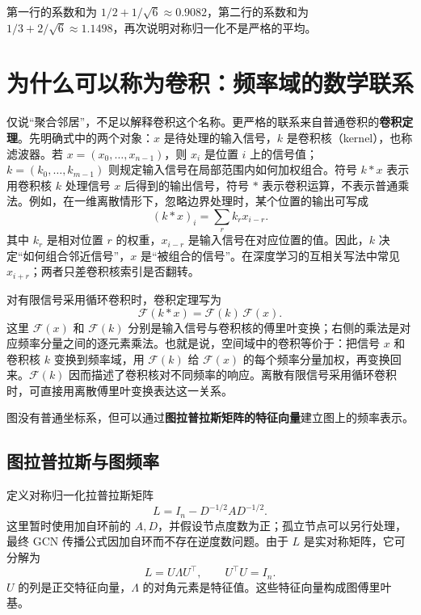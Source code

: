 \documentclass[UTF8,a4paper,11pt,fontset=fandol]{ctexart}
\begin{document}
第一行的系数和为 $1/2+1/\sqrt6\approx0.9082$，第二行的系数和为 $1/3+2/\sqrt6\approx1.1498$，再次说明对称归一化不是严格的平均。

\section{为什么可以称为卷积：频率域的数学联系}
仅说“聚合邻居”，不足以解释卷积这个名称。更严格的联系来自普通卷积的\textbf{卷积定理}。先明确式中的两个对象：$x$ 是待处理的输入信号，$k$ 是卷积核（kernel），也称滤波器。若 $x=(x_0,\ldots,x_{n-1})$，则 $x_i$ 是位置 $i$ 上的信号值；$k=(k_0,\ldots,k_{m-1})$ 则规定输入信号在局部范围内如何加权组合。符号 $k*x$ 表示用卷积核 $k$ 处理信号 $x$ 后得到的输出信号，符号 $*$ 表示卷积运算，不表示普通乘法。例如，在一维离散情形下，忽略边界处理时，某个位置的输出可写成
\begin{equation}
(k*x)_i=\sum_r k_r x_{i-r}.
\end{equation}
其中 $k_r$ 是相对位置 $r$ 的权重，$x_{i-r}$ 是输入信号在对应位置的值。因此，$k$ 决定“如何组合邻近信号”，$x$ 是“被组合的信号”。在深度学习的互相关写法中常见 $x_{i+r}$；两者只差卷积核索引是否翻转。

对有限信号采用循环卷积时，卷积定理写为
\begin{equation}
\mathcal F(k*x)=\mathcal F(k)\,\mathcal F(x).
\end{equation}
这里 $\mathcal F(x)$ 和 $\mathcal F(k)$ 分别是输入信号与卷积核的傅里叶变换；右侧的乘法是对应频率分量之间的逐元素乘法。也就是说，空间域中的卷积等价于：把信号 $x$ 和卷积核 $k$ 变换到频率域，用 $\mathcal F(k)$ 给 $\mathcal F(x)$ 的每个频率分量加权，再变换回来。$\mathcal F(k)$ 因而描述了卷积核对不同频率的响应。离散有限信号采用循环卷积时，可直接用离散傅里叶变换表达这一关系。

图没有普通坐标系，但可以通过\textbf{图拉普拉斯矩阵的特征向量}建立图上的频率表示。

\subsection{图拉普拉斯与图频率}
定义对称归一化拉普拉斯矩阵
\begin{equation}
L=I_n-D^{-1/2}AD^{-1/2}.
\label{eq:laplacian}
\end{equation}
这里暂时使用加自环前的 $A,D$，并假设节点度数为正；孤立节点可以另行处理，最终 GCN 传播公式因加自环而不存在逆度数问题。由于 $L$ 是实对称矩阵，它可分解为
\begin{equation}
L=U\Lambda U^\top,
\qquad U^\top U=I_n.
\end{equation}
$U$ 的列是正交特征向量，$\Lambda$ 的对角元素是特征值。这些特征向量构成图傅里叶基。
\end{document}
